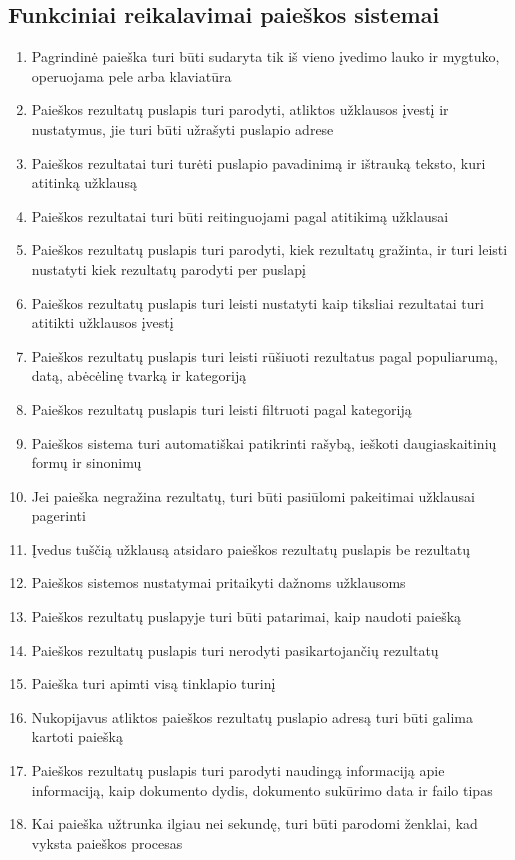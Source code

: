 \documentclass{VUMIFPSkursinis}
\begin{document}
\subsection{Funkciniai reikalavimai paieškos sistemai}
\begin{enumerate}
	\item Pagrindinė paieška turi būti sudaryta tik iš vieno įvedimo lauko ir mygtuko, operuojama pele arba klaviatūra
	\item Paieškos rezultatų puslapis turi parodyti, atliktos užklausos įvestį ir nustatymus, jie turi būti užrašyti puslapio adrese
	\item Paieškos rezultatai turi turėti puslapio pavadinimą ir ištrauką teksto, kuri atitinką užklausą
	\item Paieškos rezultatai turi būti reitinguojami pagal atitikimą užklausai
	\item Paieškos rezultatų puslapis turi parodyti, kiek rezultatų gražinta, ir turi leisti nustatyti kiek rezultatų parodyti per puslapį
	\item Paieškos rezultatų puslapis turi leisti nustatyti kaip tiksliai rezultatai turi atitikti užklausos įvestį
	\item Paieškos rezultatų puslapis turi leisti rūšiuoti rezultatus pagal populiarumą, datą, abėcėlinę tvarką ir kategoriją
	\item Paieškos rezultatų puslapis turi leisti filtruoti pagal kategoriją
	\item Paieškos sistema turi automatiškai patikrinti rašybą, ieškoti daugiaskaitinių formų ir sinonimų
	\item Jei paieška negražina rezultatų, turi būti pasiūlomi pakeitimai užklausai pagerinti
	\item Įvedus tuščią užklausą atsidaro paieškos rezultatų puslapis be rezultatų
	\item Paieškos sistemos nustatymai pritaikyti dažnoms užklausoms
	\item Paieškos rezultatų puslapyje turi būti patarimai, kaip naudoti paiešką
	\item Paieškos rezultatų puslapis turi nerodyti pasikartojančių rezultatų
	\item Paieška turi apimti visą tinklapio turinį
	\item Nukopijavus atliktos paieškos rezultatų puslapio adresą turi būti galima kartoti paiešką
	\item Paieškos rezultatų puslapis turi parodyti naudingą informaciją apie informaciją, kaip dokumento dydis, dokumento sukūrimo data ir failo tipas
	\item Kai paieška užtrunka ilgiau nei sekundę, turi būti parodomi ženklai, kad vyksta paieškos procesas
\end{enumerate}
\end{document}
